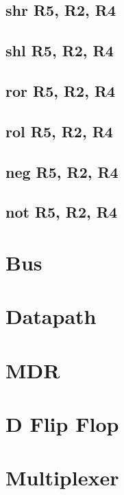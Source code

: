 \documentclass{article}
\begin{document}
\subsection{shr R5, R2, R4}
\subsection{shl R5, R2, R4}
\subsection{ror R5, R2, R4}
\subsection{rol R5, R2, R4}
\subsection{neg R5, R2, R4}
\subsection{not R5, R2, R4}

\appendix
\section{Bus}

\section{Datapath}

\section{MDR}

\section{D Flip Flop}

\section{Multiplexer}

% 
% 
\end{document}
